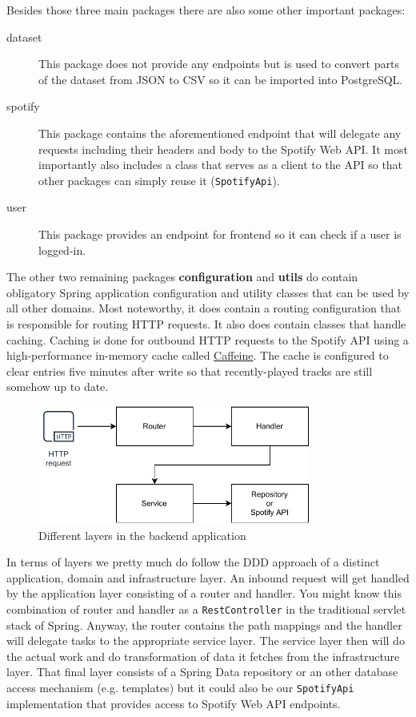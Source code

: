 Besides those three main packages there are also some other important packages:

\begin{description}
    \item[dataset] This package does not provide any endpoints but is used to convert parts of the dataset from \acs{JSON} to \acs{CSV} so it can be imported into PostgreSQL.
    \item[spotify] This package contains the aforementioned endpoint that will delegate any requests including their headers and body to the Spotify Web API. It most importantly also includes a class that serves as a client to the API so that other packages can simply reuse it (\texttt{SpotifyApi}).
    \item[user] This package provides an endpoint for frontend so it can check if a user is logged-in.
\end{description}

The other two remaining packages \textbf{configuration} and \textbf{utils} do contain obligatory Spring application configuration and utility classes that can be used by all other domains. Most noteworthy, it does contain a routing configuration that is responsible for routing \ac{HTTP} requests. It also does contain classes that handle caching. Caching is done for outbound \ac{HTTP} requests to the Spotify API using a high-performance in-memory cache called \href{https://github.com/ben-manes/caffeine}{Caffeine}. The cache is configured to clear entries five minutes after write so that recently-played tracks are still somehow up to date.

\begin{figure}[bth]
    \centering
    \includegraphics[width=0.8\textwidth]{Graphics/Chapter3/backend-layers.pdf}
    \caption{Different layers in the backend application}
\end{figure}

In terms of layers we pretty much do follow the \ac{DDD} approach of a distinct application, domain and infrastructure layer. An inbound request will get handled by the application layer consisting of a router and handler. You might know this combination of router and handler as a \texttt{RestController} in the traditional servlet stack of Spring. Anyway, the router contains the path mappings and the handler will delegate tasks to the appropriate service layer. The service layer then will do the actual work and do transformation of data it fetches from the infrastructure layer. That final layer consists of a Spring Data repository or an other database access mechanism (e.g. templates) but it could also be our \texttt{SpotifyApi} implementation that provides access to Spotify Web API endpoints.

